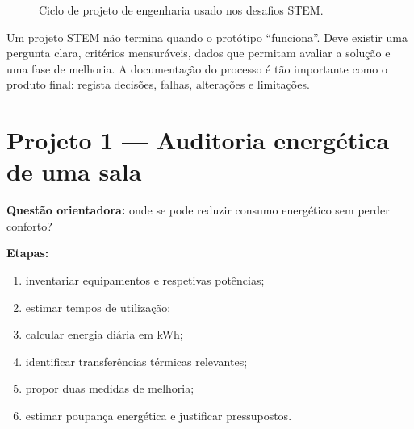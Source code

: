 \documentclass[11pt,a4paper,oneside]{book}
\begin{document}
\begin{figure}[H]
\centering
{}
\caption{Ciclo de projeto de engenharia usado nos desafios STEM.}
\end{figure}

Um projeto STEM não termina quando o protótipo ``funciona''. Deve existir uma pergunta clara, critérios mensuráveis, dados que permitam avaliar a solução e uma fase de melhoria. A documentação do processo é tão importante como o produto final: regista decisões, falhas, alterações e limitações.

\section{Projeto 1 — Auditoria energética de uma sala}
\textbf{Questão orientadora:} onde se pode reduzir consumo energético sem perder conforto?

\textbf{Etapas:}
\begin{enumerate}
  \item inventariar equipamentos e respetivas potências;
  \item estimar tempos de utilização;
  \item calcular energia diária em kWh;
  \item identificar transferências térmicas relevantes;
  \item propor duas medidas de melhoria;
  \item estimar poupança energética e justificar pressupostos.
\end{enumerate}
\end{document}
